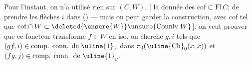 Pour l'instant, on n'a utilisé rien sur $(C,W)$, [  la donnée des $\mathrm{cof}\subset\mathrm{Fl}\,C$;  de prendre les flèches $i$ dans () --- mais  on peut garder la construction, avec $\mathrm{cof}$  tel que $\mathrm{cof}\cap W\subset\deleted{\unsure{W}}\unsure{\mathrm{Couniv.}W}$].   on veut prouver que ce foncteur transforme $f\in W$ en iso.
on cherche $g,i$ tels que $(gf,i)\in\text{comp. conn. de }\uline{1}_x$ dans $\pi_0(\uline{\mathrm{Ch}}_0(x,x))$ et $(\bar f g,j)\in\text{comp. conn. de }\uline{1}_y$.

